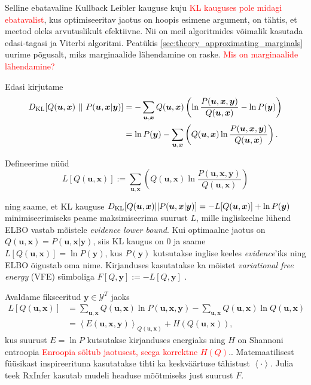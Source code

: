 Selline ebatavaline Kullback Leibler kauguse kuju
\textcolor{red}{KL kauguses pole midagi ebatavalist}, kus optimiseeritav jaotus on hoopis esimene argument, on tähtis, et meetod oleks arvutuslikult efektiivne. Nii on meil algoritmides võimalik kasutada edasi-tagasi ja Viterbi algoritmi. Peatükis \ref{sec:theory_approximating_marginals} uurime põgusalt, miks marginaalide lähendamine on raske. \textcolor{red}{Mis on marginaalide lähendamine?}

Edasi kirjutame 
\begin{align}
    \label{eq:kl}
    D_{\mathrm{KL}}[Q(\bm{u}, \bm{x}) \ ||\ P(\bm{u}, \bm{x} | \bm{y})] &= - \sum_{\bm{u}, \bm{x}} Q(\bm{u}, \bm{x}) \left( \ln \frac{P(\bm{u}, \bm{x}, \bm{y})}{Q(\bm{u}, \bm{x})} - \ln P(\bm{y}) \right) \\
    \nonumber
    &= \ln P(\bm{y}) - \sum_{\bm{u}, \bm{x}} \left( Q(\bm{u}, \bm{x}) \ln \frac{P(\bm{u}, \bm{x}, \bm{y})}{Q(\bm{u}, \bm{x})}\right).
\end{align}

Defineerime nüüd
\begin{equation}
\label{eq:elbo}
L[Q(\bm{u}, \bm{x})] := \sum_{\bm{u}, \bm{x}} \left( Q(\bm{u}, \bm{x}) \ln \frac{P(\bm{u}, \bm{x}, \bm{y})}{Q(\bm{u}, \bm{x})}\right)
\end{equation}

ning saame, et KL kauguse $D_{\mathrm{KL}}[Q(\bm{u}, \bm{x}) || P(\bm{u}, \bm{x} | \bm{y})] = -L[Q(\bm{u}, \bm{x})] + \ln P(\bm{y})$ minimiseerimiseks peame maksimiseerima suurust $L$, mille ingliskeelne lühend ELBO vastab mõistele \textit{evidence lower bound}. Kui optimaalne jaotus on $Q(\bm{u},\bm{x}) = P(\bm{u},\bm{x}| \bm{y})$, siis KL kaugus on $0$ ja saame $L[Q(\bm{u}, \bm{x})] = \ln P(\bm{y})$, kus $P(\bm{y})$ kutsutakse inglise keeles \emph{evidence}'iks ning ELBO õigustab oma nime. Kirjanduses kasutatakse ka mõistet \textit{variational free energy} (VFE) sümboliga $F[Q, \bm{y}] := -L[Q, \bm{y}]$ \parencite{Parr.2019}.

Avaldame fikseeritud $\bm{y} \in \mathcal{Y}^T$ jaoks
\begin{align}
    \label{eq:elbo1}
    L[Q(\bm{u}, \bm{x})] &=\sum_{\bm{u}, \bm{x}} Q(\bm{u}, \bm{x}) \ln P(\bm{u}, \bm{x}, \bm{y}) - \sum_{\bm{u}, \bm{x}} Q(\bm{u}, \bm{x}) \ln Q(\bm{u}, \bm{x})\\
    \label{eq:elbo2}
    &= \left< E (\bm{u}, \bm{x},\bm{y}) \right>_{Q(\bm{u}, \bm{x})} + H(Q(\bm{u}, \bm{x})),
\end{align}
kus suurust $E = \ln P$ kutsutakse kirjanduses energiaks ning $H$ on Shannoni entroopia \textcolor{red}{Enroopia sõltub jaotusest, seega korrektne $H(Q)$}.. Matemaatilisest füüsikast inspireerituna kasutatakse tihti ka keskväärtuse tähistust $\left<  \cdot \right>$. Julia teek RxInfer kasutab mudeli headuse mõõtmiseks just suurust $F$.

